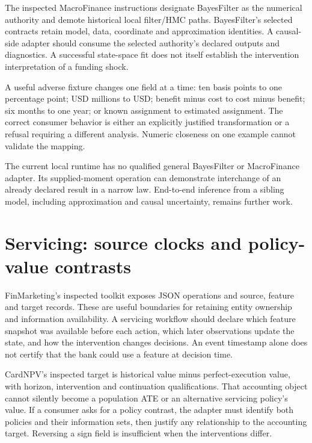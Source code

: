 The inspected MacroFinance instructions designate BayesFilter as the numerical
authority and demote historical local filter/HMC paths. BayesFilter's selected
contracts retain model, data, coordinate and approximation identities.
\cite{v12_in_inventory} A causal-side adapter should consume the selected
authority's declared outputs and diagnostics. A successful state-space fit
does not itself establish the intervention interpretation of a funding shock.

A useful adverse fixture changes one field at a time: ten basis points to one
percentage point; USD millions to USD; benefit minus cost to cost minus benefit;
six months to one year; or known assignment to estimated assignment. The
correct consumer behavior is either an explicitly justified transformation or
a refusal requiring a different analysis. Numeric closeness on one example
cannot validate the mapping.

The current local runtime has no qualified general BayesFilter or MacroFinance
adapter. Its supplied-moment operation can demonstrate interchange of an
already declared result in a narrow law. End-to-end inference from a sibling
model, including approximation and causal uncertainty, remains further work.

\section{Servicing: source clocks and policy-value contrasts}

FinMarketing's inspected toolkit exposes JSON operations and source, feature
and target records. These are useful boundaries for retaining entity ownership
and information availability.\cite{v12_in_inventory} A servicing workflow should
declare which feature snapshot was available before each action, which later
observations update the state, and how the intervention changes decisions.
An event timestamp alone does not certify that the bank could use a feature
at decision time.

CardNPV's inspected target is historical value minus perfect-execution value,
with horizon, intervention and continuation qualifications.
\cite{v12_in_inventory} That accounting object cannot silently become a
population ATE or an alternative servicing policy's value. If a consumer asks
for a policy contrast, the adapter must identify both policies and their
information sets, then justify any relationship to the accounting target.
Reversing a sign field is insufficient when the interventions differ.

